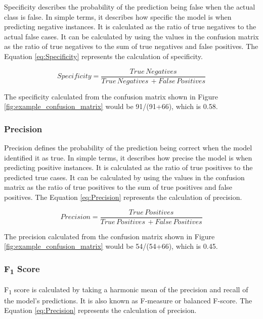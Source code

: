 \documentclass[11pt,openright]{report}
\begin{document}
Specificity describes the probability of the prediction being false when the actual class is false. In simple terms, it describes how specific the model is when predicting negative instances. It is calculated as the ratio of true negatives to the actual false cases. It can be calculated by using the values in the confusion matrix as the ratio of true negatives to the sum of true negatives and false positives. The Equation \ref{eq:Specificity}  represents the calculation of specificity.

\begin{equation}
Specificity = \dfrac{True\, Negatives }{True\, Negatives\, + False\, Positives} \label{eq:Specificity} 
 \end{equation}

The specificity calculated from the confusion matrix shown in Figure \ref{fig:example_confusion_matrix} would be 91/(91+66), which is 0.58.

\subsubsection{Precision}
Precision defines the probability of the prediction being correct when the model identified it as true. In simple terms, it describes how precise the model is when predicting positive instances. It is calculated as the ratio of true positives to the predicted true cases. It can be calculated by using the values in the confusion matrix as the ratio of true positives to the sum of true positives and false positives. The Equation \ref{eq:Precision}  represents the calculation of precision.

\begin{equation}
Precision = \dfrac{True\, Positives }{True\, Positives\, + False\, Positives} \label{eq:Precision} 
 \end{equation}

The precision calculated from the confusion matrix shown in Figure \ref{fig:example_confusion_matrix} would be 54/(54+66), which is 0.45.

\subsubsection{F\textsubscript1 Score}

F\textsubscript{1} score is calculated by taking a harmonic mean of the precision and recall of the model's predictions. It is also known as F-measure or balanced F-score. The Equation \ref{eq:Precision}  represents the calculation of precision.
\end{document}
